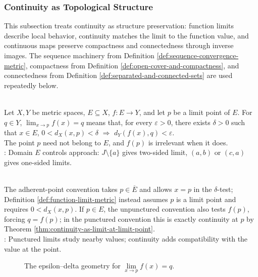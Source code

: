 \subsubsection{Continuity as Topological Structure}


This subsection treats continuity as structure preservation: function limits describe local behavior, continuity matches the limit to the function value, and continuous maps preserve compactness and connectedness through inverse images. The sequence machinery from Definition \ref{def:sequence-convergence-metric}, compactness from Definition \ref{def:open-cover-and-compactness}, and connectedness from Definition \ref{def:separated-and-connected-sets} are used repeatedly below.

\begin{definition} \label{def:function-limit-metric}\label{def:continuity-core-definitions-source-todo} \\
Let $X,Y$ be metric spaces, $E\subseteq X$, $f:E\to Y$, and let $p$ be a limit point of $E$. For $q\in Y$, $\lim_{x\to p} f(x)=q$ means that, for every $\varepsilon>0$, there exists $\delta>0$ such that $x\in E$, $0<d_X(x,p)<\delta$ $\Longrightarrow$ $d_Y(f(x),q)<\varepsilon$.\\
The point $p$ need not belong to $E$, and $f(p)$ is irrelevant when it does.\\
: Domain $E$ controls approach: $J\setminus\{a\}$ gives two-sided limit,  $(a,b)$ or $(c,a)$ gives one-sided limits.
\end{definition}

\begin{remark} \label{rem:adherent-function-limits-convention} \\
The adherent-point convention takes $p\in\overline{E}$ and allows $x=p$ in the $\delta$-test; Definition \ref{def:function-limit-metric} instead assumes $p$ is a limit point and requires $0<d_X(x,p)$. If $p\in E$, the unpunctured convention also tests $f(p)$, forcing $q=f(p)$; in the punctured convention this is exactly continuity at $p$ by Theorem \ref{thm:continuity-as-limit-at-limit-point}.\\
: Punctured limits study nearby values; continuity adds compatibility with the value at the point.
\end{remark}

\begin{figure}[H]
  \centering
  
  \caption{The epsilon--delta geometry for \(\lim\limits_{x\to p} f(x)=q\).}
  \label{fig:function-limit-epsilon-delta}
\end{figure}


